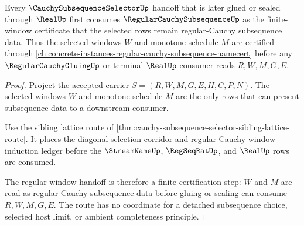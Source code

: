 \begin{theorem}
\label{thm:cauchy-subsequence-selector-regular-window-handoff}
Every $\CauchySubsequenceSelectorUp$ handoff that is later glued or sealed through $\RealUp$ first consumes $\RegularCauchySubsequenceUp$ as the finite-window certificate that the selected rows remain regular-Cauchy subsequence data. Thus the selected windows $W$ and monotone schedule $M$ are certified through \autoref{ch:concrete-instances-regular-cauchy-subsequence-namecert} before any $\RegularCauchyGluingUp$ or terminal $\RealUp$ consumer reads $R,W,M,G,E$.
\end{theorem}
\begin{proof}
Project the accepted carrier $S=(R,W,M,G,E,H,C,P,N)$. The selected windows $W$ and monotone schedule $M$ are the only rows that can present subsequence data to a downstream consumer.

Use the sibling lattice route of \autoref{thm:cauchy-subsequence-selector-sibling-lattice-route}. It places the diagonal-selection corridor and regular Cauchy window-induction ledger before the $\StreamNameUp$, $\RegSeqRatUp$, and $\RealUp$ rows are consumed.

The regular-window handoff is therefore a finite certification step: $W$ and $M$ are read as regular-Cauchy subsequence data before gluing or sealing can consume $R,W,M,G,E$. The route has no coordinate for a detached subsequence choice, selected host limit, or ambient completeness principle.
\end{proof}

